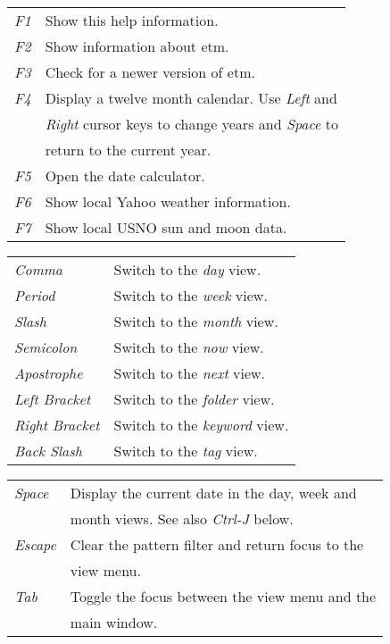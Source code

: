 \documentclass[9pt,landscape]{article}
\begin{document}
\begin{multicols}{3}
\begin{tabular}{@{}ll@{}}
\emph{F1} & Show this help information. \\
\emph{F2}               & Show information about etm. \\
\emph{F3}               & Check for a newer version of etm. \\
\emph{F4}               & Display a twelve month calendar. Use \emph{Left} and \\
                        & \emph{Right} cursor keys to change years and \emph{Space} to \\
                        & return to the current year. \\
\emph{F5}               & Open the date calculator. \\
\emph{F6}               & Show local Yahoo weather information. \\
\emph{F7}               & Show local USNO sun and moon data. \\
\end{tabular}
\begin{tabular}{@{}ll@{}}
\emph{Comma}            & Switch to the \emph{day} view. \\
\emph{Period}           & Switch to the \emph{week} view. \\
\emph{Slash}            & Switch to the \emph{month} view. \\
\emph{Semicolon}        & Switch to the \emph{now} view. \\
\emph{Apostrophe}       & Switch to the \emph{next} view. \\
\emph{Left Bracket}     & Switch to the \emph{folder} view. \\
\emph{Right Bracket}    & Switch to the \emph{keyword} view. \\
\emph{Back Slash}       & Switch to the \emph{tag} view. \\
\end{tabular}
\begin{tabular}{@{}ll@{}}
\emph{Space}         & Display the current date in the day, week and \\
                        & month views. See also \emph{Ctrl-J} below. \\
\emph{Escape}           & Clear the pattern filter and return focus to the \\
                        & view menu. \\
\emph{Tab}              & Toggle the focus between the view menu and the \\
                        & main window. \\

\end{tabular}
\end{multicols}
\end{document}
